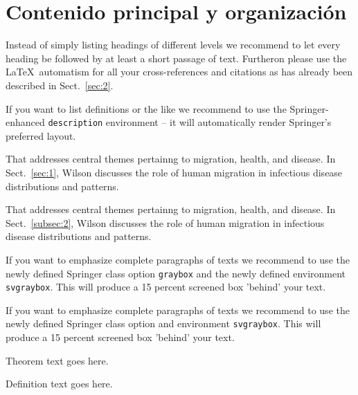 \section{Contenido principal y organización}
\label{sec:3}
Instead of simply listing headings of different levels we recommend to let every heading be followed by at least a short passage of text. Furtheron please use the \LaTeX\ automatism for all your cross-references and citations as has already been described in Sect.~\ref{sec:2}.

If you want to list definitions or the like we recommend to use the Springer-enhanced \verb|description| environment -- it will automatically render Springer's preferred layout.

\begin{description}[Type 1]
    \item[Type 1]{That addresses central themes pertainng to migration, health, and disease. In Sect.~\ref{sec:1}, Wilson discusses the role of human migration in infectious disease distributions and patterns.}
    \item[Type 2]{That addresses central themes pertainng to migration, health, and disease. In Sect.~\ref{subsec:2}, Wilson discusses the role of human migration in infectious disease distributions and patterns.}
\end{description}

\begin{svgraybox}
    If you want to emphasize complete paragraphs of texts we recommend to use the newly defined Springer class option \verb|graybox| and the newly defined environment \verb|svgraybox|. This will produce a 15 percent screened box 'behind' your text.

    If you want to emphasize complete paragraphs of texts we recommend to use the newly defined Springer class option and environment \verb|svgraybox|. This will produce a 15 percent screened box 'behind' your text.
\end{svgraybox}

\begin{theorem}
    Theorem text goes here.
\end{theorem}

\begin{definition}
    Definition text goes here.
\end{definition}

